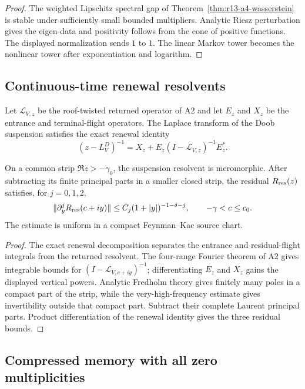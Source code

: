 \begin{proof}
The weighted Lipschitz spectral gap of
Theorem~\ref{thm:r13-a4-wasserstein} is stable under sufficiently small
bounded multipliers.  Analytic Riesz perturbation gives the eigen-data and
positivity follows from the cone of positive functions.  The displayed
normalization sends $1$ to $1$.  The linear Markov tower becomes the nonlinear
tower after exponentiation and logarithm.
\end{proof}

\subsection{Continuous-time renewal resolvents}

Let $\mathcal L_{V,z}$ be the roof-twisted returned operator of A2 and let
$E_z$ and $X_z$ be the entrance and terminal-flight operators.  The Laplace
transform of the Doob suspension satisfies the exact renewal identity
\[
 (z-L_V^D)^{-1}=X_z+E_z(I-\mathcal L_{V,z})^{-1}E_z^*.
\]

\begin{theorem}
\label{thm:r13-a4-renewal}
On a common strip $\Re z>-\gamma_0$, the suspension resolvent is meromorphic.
After subtracting its finite principal parts in a smaller closed strip, the
residual $R_{\rm res}(z)$ satisfies, for $j=0,1,2$,
\[
 \|\partial_y^jR_{\rm res}(c+iy)\|
 \le C_j(1+|y|)^{-1-\delta-j},
 \qquad -\gamma<c\le c_0.
\]
The estimate is uniform in a compact Feynman--Kac source chart.
\end{theorem}

\begin{proof}
The exact renewal decomposition separates the entrance and residual-flight
integrals from the returned resolvent.  The four-range Fourier theorem of A2
gives integrable bounds for $(I-\mathcal L_{V,c+iy})^{-1}$; differentiating
$E_z$ and $X_z$ gains the displayed vertical powers.  Analytic Fredholm theory
gives finitely many poles in a compact part of the strip, while the
very-high-frequency estimate gives invertibility outside that compact part.
Subtract their complete Laurent principal parts.  Product differentiation of
the renewal identity gives the three residual bounds.
\end{proof}

\subsection{Compressed memory with all zero multiplicities}

